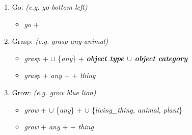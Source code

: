 \begin{enumerate}[leftmargin=0.6cm, nolistsep]
    \item Go: \textit{(e.g. go bottom left)} 
    \begin{itemize}[leftmargin=0.2cm,noitemsep]
            \itemsep-0.3em 
            \item \textit{go} + 
            \end{itemize}
    \item Grasp: \textit{(e.g. grasp any animal)} 
        \begin{itemize}[leftmargin=0.2cm,noitemsep]
            \itemsep-0.3em 
            \item \textit{grasp} +  $\cup$ \{\textit{any}\}  + \textbf{\textit{object type $\cup$ object category}}
            \item \textit{grasp} + \textit{any} +  + \textit{thing}
        \end{itemize}
    \item Grow: \textit{(e.g. grow blue lion)}
        \begin{itemize}[leftmargin=0.2cm,noitemsep]
            \itemsep-0.3em 
            \item \textit{grow} +  $\cup$ \{\textit{any}\} +  $\cup$ \{\textit{living\_thing, animal, plant}\}
            \item \textit{grow} + \textit{any} +  + \textit{thing}
    \end{itemize}
\end{enumerate} 

